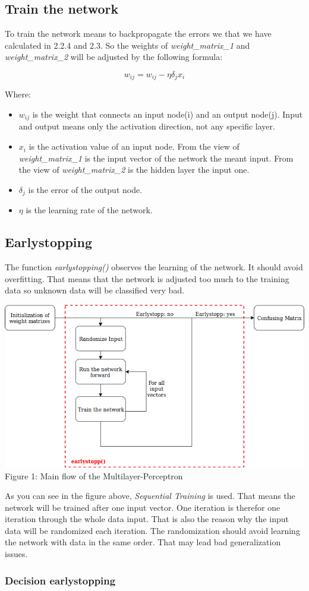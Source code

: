 \documentclass[10pt,a4paper]{article}
\begin{document}
	\subsection{Train the network}				%
	To train the network means to backpropagate the errors we that we have calculated in 2.2.4 and 2.3. So the weights of \textit{weight\_matrix\_1} and \textit{weight\_matrix\_2} will be adjusted by the following formula:
	\begin{center}
		\begin{equation}
		w_{ij} = w_{ij} - \eta \delta_j x_i
		\end{equation} 
	\end{center}
	Where:
	\begin{itemize}
		\item $w_{ij}$ is the weight that connects an input node(i) and an output node(j). Input and output means only the activation direction, not any specific layer.
		\item $x_i$ is the activation value of an input node. From the view of \textit{weight\_matrix\_1} is the input vector of the network the meant input. From the view of \textit{weight\_matrix\_2} is the hidden layer the input one.
		\item  $\delta_j$ is the error of the output node.
		\item $\eta$ is the learning rate of the network. 

	\end{itemize}   
	\subsection{Earlystopping}				%
	The function \textit{earlystopping()} observes the learning of the network. It should avoid overfitting. That means that the network is adjusted too much to the training data so unknown data will be classified very bad.
	\begin{center}
		\includegraphics[width=0.9\linewidth]{"pictures/Untitled Diagram"} \\
		Figure 1: Main flow of the Multilayer-Perceptron 
	\end{center}
	As you can see in the figure above, \textit{Sequential Training} is used. That means the network will be trained after one input vector. One iteration is therefor one iteration through the whole data input. That is also the reason why the input data will be randomized each iteration. The randomization should avoid learning the network with data in the same order. That may lead bad generalization issues.
	\subsubsection{Decision earlystopping}		%
	  
\end{document}
